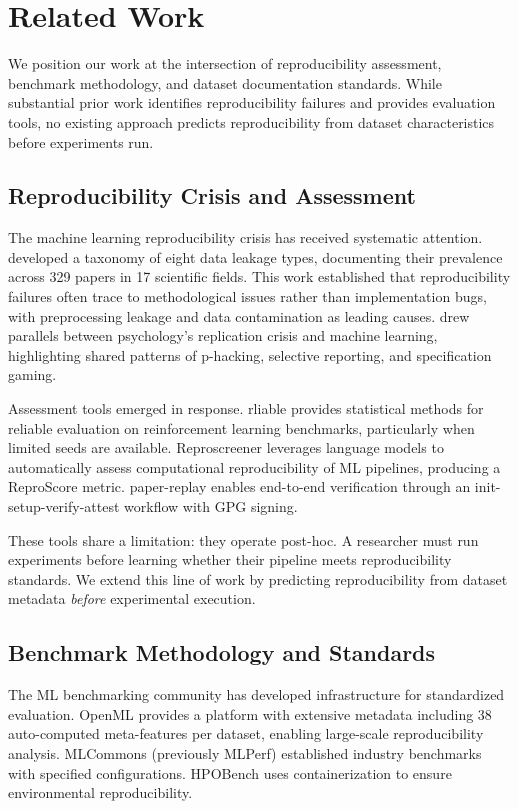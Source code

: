 \section{Related Work}

We position our work at the intersection of reproducibility assessment, benchmark methodology, and dataset documentation standards. While substantial prior work identifies reproducibility failures and provides evaluation tools, no existing approach predicts reproducibility from dataset characteristics before experiments run.

\subsection{Reproducibility Crisis and Assessment}

The machine learning reproducibility crisis has received systematic attention. \citet{kapoor2022leakage} developed a taxonomy of eight data leakage types, documenting their prevalence across 329 papers in 17 scientific fields. This work established that reproducibility failures often trace to methodological issues rather than implementation bugs, with preprocessing leakage and data contamination as leading causes. \citet{hullman2022worst} drew parallels between psychology's replication crisis and machine learning, highlighting shared patterns of p-hacking, selective reporting, and specification gaming.

Assessment tools emerged in response. rliable \citep{agarwal2021deep} provides statistical methods for reliable evaluation on reinforcement learning benchmarks, particularly when limited seeds are available. Reproscreener \citep{bhaskar2024reproscreener} leverages language models to automatically assess computational reproducibility of ML pipelines, producing a ReproScore metric. paper-replay enables end-to-end verification through an init-setup-verify-attest workflow with GPG signing.

These tools share a limitation: they operate post-hoc. A researcher must run experiments before learning whether their pipeline meets reproducibility standards. We extend this line of work by predicting reproducibility from dataset metadata \emph{before} experimental execution.

\subsection{Benchmark Methodology and Standards}

The ML benchmarking community has developed infrastructure for standardized evaluation. OpenML \citep{vanschoren2014openml} provides a platform with extensive metadata including 38 auto-computed meta-features per dataset, enabling large-scale reproducibility analysis. MLCommons (previously MLPerf) established industry benchmarks with specified configurations. HPOBench \citep{eggensperger2021hpobench} uses containerization to ensure environmental reproducibility.

